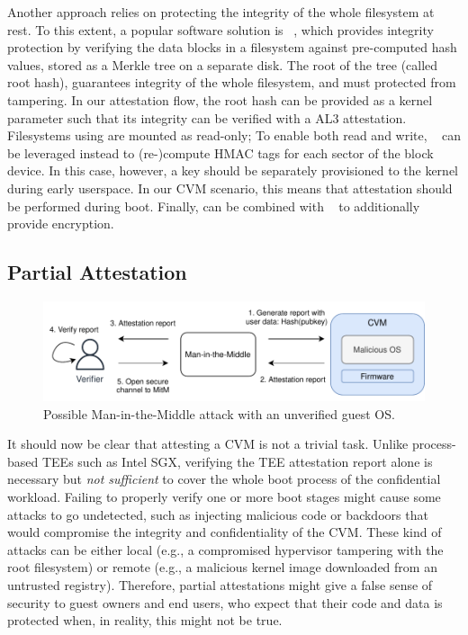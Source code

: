 Another approach relies on protecting the integrity of the whole filesystem at
rest. 
To this extent, a popular software solution is \dmverity~\cite{dmVerity}, which
provides integrity protection by verifying the data blocks in a filesystem
against pre-computed hash values, stored as a Merkle tree on a separate disk.
The root of the tree (called root hash), guarantees integrity of the whole
filesystem, and must protected from tampering. In our attestation flow, the root
hash can be provided as a kernel parameter such that its integrity can be
verified with a AL3 attestation. Filesystems using \dmverity{} are mounted as
read-only; To enable both read and write, \dmintegrity{}~\cite{dmIntegrity} can
be leveraged instead to (re-)compute HMAC tags for each sector of the block
device. In this case, however, a key should be separately provisioned to the
kernel during early userspace. In our \ac{CVM} scenario, this means that
attestation should be performed during boot. Finally, \dmintegrity{} can be
combined with \dmcrypt{}~\cite{dmCrypt} to additionally provide encryption.

\subsection{Partial Attestation}
\label{section:partial-attestation}

\begin{figure}[t]
  \centering
    \includegraphics[width=\columnwidth]{figures/partial-attestation.drawio.pdf}
  \caption{Possible Man-in-the-Middle attack with an unverified guest OS.}
  \label{fig:partial-attestation}
\end{figure}


It should now be clear that attesting a \ac{CVM} is not a trivial task. Unlike
process-based \acp{TEE} such as Intel SGX, verifying the \ac{TEE} attestation
report alone is necessary but \emph{not sufficient} to cover the whole boot
process of the confidential workload. Failing to properly verify one or more
boot stages might cause some attacks to go undetected, such as injecting
malicious code or backdoors that would compromise the integrity and
confidentiality of the \ac{CVM}. These kind of attacks can be either local
(e.g., a compromised hypervisor tampering with the root filesystem) or remote
(e.g., a malicious kernel image downloaded from an untrusted
registry). Therefore, partial attestations might give a false sense of security
to guest owners and end users, who expect that their code and data is protected
when, in reality, this might not be true.

